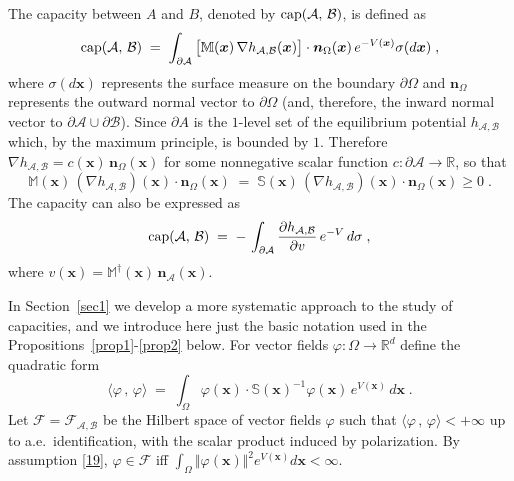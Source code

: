 \documentclass[reqno]{amsart}
\newcounter{as}[section]
\newcommand{\mc}[1]{{\mathcal #1}}
\newcommand{\bb}[1]{{\mathbb #1}}
\newcommand{\bs}[1]{{\boldsymbol #1}}
\newcommand{\<}{\langle}
\renewcommand{\>}{\rangle}
\renewcommand{\Cap}{{\rm cap}}
\begin{document}
The capacity between $A$ and $B$, denoted by $\Cap (\mc A,\,\mc B)$,
is defined as
\begin{equation}
\label{06}
\Cap (\mc A,\,\mc B) \;=\; \int_{\partial \mc A} \big[ \bb M(\bs{x}) \, \nabla
h_{\mc A,\mc B}(\bs{x}) \big] \cdot \bs n_\Omega(\bs{x})  \, e^{-V(\bs{x})} \sigma (d\bs{x})\;,
\end{equation}
where $\sigma(d\bs{x})$ represents the surface measure on the boundary
$\partial \Omega$ and $\bs n_\Omega$ represents the outward normal
vector to $\partial \Omega$ (and, therefore, the inward normal vector
to $\partial \mc A \cup \partial \mc B$). Since $\partial A$ is the
$1$-level set of the equilibrium potential $h_{\mc A,\mc B}$ which, by
the maximum principle, is bounded by $1$. Therefore $\nabla h_{\mc
    A,\mc B} = c (\bs{x}) \, \bs n_{\Omega}(\bs{x})$ for some nonnegative scalar function $c\colon \partial \mc A \to \bb R$, so that
\begin{equation*}
\bb M (\bs{x}) \, (\nabla h_{\mc A,\mc B}) (\bs{x})
\cdot \bs n_{\Omega}(\bs{x})
\;=\; \bb S(\bs{x}) \, (\nabla h_{\mc A,\mc B})
(\bs{x}) \cdot \bs n_{\Omega}(\bs{x}) \ge 0\;.
\end{equation*}
The capacity can also be expressed as
\begin{equation*}
\Cap (\mc A,\,\mc B) \;=\;
-\, \int_{\partial \mc A} \frac{\partial h_{\mc A,\mc B}}{\partial v}
\, e^{-V} \, d \sigma \;,
\end{equation*}
where $v(\bs{x}) = \bb M^\dagger (\bs{x}) \, \bs n_\mc A(\bs{x})$.

In Section~\ref{sec1} we develop a more systematic approach to the
study of capacities, and we introduce here just the basic notation
used in the Propositions~\ref{prop1}-\ref{prop2} below. For vector
fields $\varphi \colon \Omega \to \bb R^d$ define the quadratic form
\begin{equation*}
\< \varphi \,,\, \varphi \> \;=\; \int_{\Omega} \varphi(\bs{x}) \cdot \bb
S(\bs{x})^{-1} \varphi(\bs{x}) \, e^{V(\bs{x})}\, d\bs{x}\;.
\end{equation*}
Let $\mathcal F = \mathcal F_{\mc A,\mc B}$ be the Hilbert space of
vector fields $\varphi$ such that $\< \varphi \,,\, \varphi
\><+\infty$ up to a.e.\ identification, with the scalar product
induced by polarization. By assumption \eqref{19}, $\varphi \in
\mathcal F$ iff $\int_\Omega \Vert \varphi (\bs{x})\Vert^2 e^{V(\bs
  x)}d\bs x <\infty$.
\end{document}
